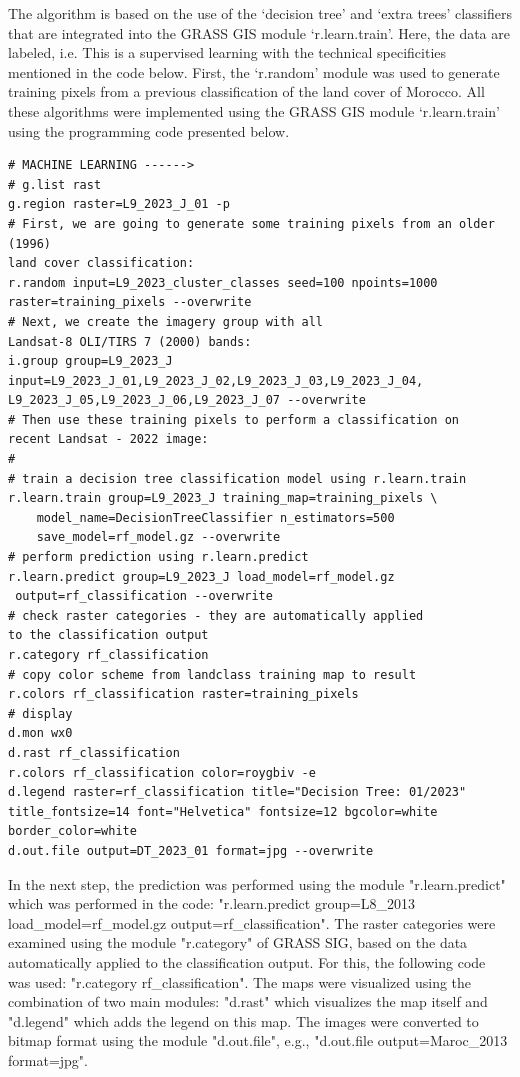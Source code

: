 \documentclass[geomatics,article,submit,pdftex,moreauthors]{Definitions/mdpi}
\begin{document}
The algorithm is based on the use of the ‘decision tree’ and ‘extra trees’ classifiers that are integrated into the GRASS GIS module ‘r.learn.train’. Here, the data are labeled, i.e. This is a supervised learning with the technical specificities mentioned in the code below. First, the ‘r.random’ module was used to generate training pixels from a previous classification of the land cover of Morocco. All these algorithms were implemented using the GRASS GIS module ‘r.learn.train’ using the programming code presented below.

\begin{footnotesize}
\begin{verbatim}
# MACHINE LEARNING ------>
# g.list rast
g.region raster=L9_2023_J_01 -p
# First, we are going to generate some training pixels from an older (1996) 
land cover classification:
r.random input=L9_2023_cluster_classes seed=100 npoints=1000 
raster=training_pixels --overwrite
# Next, we create the imagery group with all 
Landsat-8 OLI/TIRS 7 (2000) bands:
i.group group=L9_2023_J 
input=L9_2023_J_01,L9_2023_J_02,L9_2023_J_03,L9_2023_J_04,
L9_2023_J_05,L9_2023_J_06,L9_2023_J_07 --overwrite
# Then use these training pixels to perform a classification on 
recent Landsat - 2022 image:
#
# train a decision tree classification model using r.learn.train
r.learn.train group=L9_2023_J training_map=training_pixels \
    model_name=DecisionTreeClassifier n_estimators=500 
    save_model=rf_model.gz --overwrite
# perform prediction using r.learn.predict
r.learn.predict group=L9_2023_J load_model=rf_model.gz
 output=rf_classification --overwrite
# check raster categories - they are automatically applied 
to the classification output
r.category rf_classification
# copy color scheme from landclass training map to result
r.colors rf_classification raster=training_pixels
# display
d.mon wx0
d.rast rf_classification
r.colors rf_classification color=roygbiv -e
d.legend raster=rf_classification title="Decision Tree: 01/2023" 
title_fontsize=14 font="Helvetica" fontsize=12 bgcolor=white 
border_color=white
d.out.file output=DT_2023_01 format=jpg --overwrite
\end{verbatim}
\end{footnotesize}

In the next step, the prediction was performed using the module "r.learn.predict" which was performed in the code: "r.learn.predict group=L8\_2013 load\_model=rf\_model.gz output=rf\_classification". The raster categories were examined using the module "r.category" of GRASS SIG, based on the data automatically applied to the classification output. For this, the following code was used: "r.category rf\_classification". The maps were visualized using the combination of two main modules: "d.rast" which visualizes the map itself and "d.legend" which adds the legend on this map. The images were converted to bitmap format using the module "d.out.file", e.g., "d.out.file output=Maroc\_2013 format=jpg".
\end{document}
